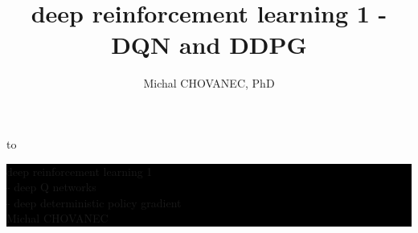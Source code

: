 \documentclass[xcolor=dvipsnames]{beamer}
\title{\color{white} \bf deep reinforcement learning 1 - DQN and DDPG}
\author{\color{white} Michal CHOVANEC, PhD}
\date[EURP]{}
\begin{document}
{
    \usebackgroundtemplate
    {
        \vbox to 
    }



    \begin{frame}

    \centering
     \colorbox{black}
     {
        \begin{minipage}{8cm}
           {\LARGE \color{white}deep reinforcement learning 1} \\
           {\Large \color{white}- deep Q networks} \\
           {\Large \color{white}- deep deterministic policy gradient} \\
           {\LARGE \color{white} Michal CHOVANEC} \\
       \end{minipage}
     }

    \end{frame}
}
\end{document}
